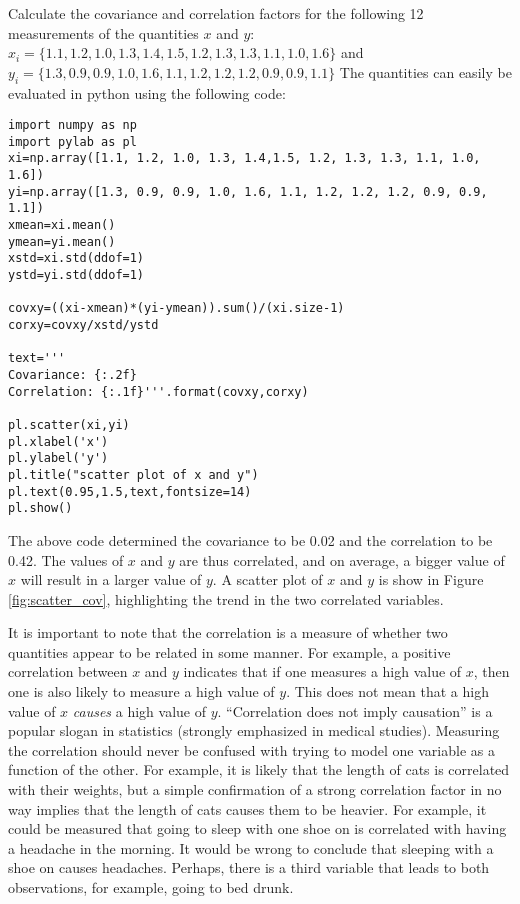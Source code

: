 \begin{example}{}{Calculate the covariance and correlation factors for the following 12 measurements of the quantities $x$ and $y$: $x_i=\{1.1, 1.2, 1.0, 1.3, 1.4,1.5, 1.2, 1.3, 1.3, 1.1, 1.0, 1.6\}$ and $y_i=\{1.3, 0.9, 0.9, 1.0, 1.6, 1.1, 1.2, 1.2, 1.2, 0.9, 0.9, 1.1\}$}{}
\label{ex:covariance}
The quantities can easily be evaluated in python using the following code:
\begin{lstlisting}[frame=single] 
import numpy as np
import pylab as pl
xi=np.array([1.1, 1.2, 1.0, 1.3, 1.4,1.5, 1.2, 1.3, 1.3, 1.1, 1.0, 1.6])
yi=np.array([1.3, 0.9, 0.9, 1.0, 1.6, 1.1, 1.2, 1.2, 1.2, 0.9, 0.9, 1.1])
xmean=xi.mean()
ymean=yi.mean()
xstd=xi.std(ddof=1)
ystd=yi.std(ddof=1)

covxy=((xi-xmean)*(yi-ymean)).sum()/(xi.size-1)
corxy=covxy/xstd/ystd

text='''
Covariance: {:.2f}
Correlation: {:.1f}'''.format(covxy,corxy)

pl.scatter(xi,yi)
pl.xlabel('x')
pl.ylabel('y')
pl.title("scatter plot of x and y")
pl.text(0.95,1.5,text,fontsize=14)
pl.show()
\end{lstlisting}
The above code determined the covariance to be 0.02 and the correlation to be 0.42. The values of $x$ and $y$ are thus correlated, and on average, a bigger value of $x$ will result in a larger value of $y$. A scatter plot of $x$ and $y$ is show in Figure \ref{fig:scatter_cov}, highlighting the trend in the two correlated variables.


\end{example}

It is important to note that the correlation is a measure of whether two quantities appear to be related in some manner. For example, a positive correlation between $x$ and $y$ indicates that if one measures a high value of $x$, then one is also likely to measure a high value of $y$. This does not mean that a high value of $x$ \textit{causes} a high value of $y$. ``Correlation does not imply causation'' is a popular slogan in statistics (strongly emphasized in medical studies). Measuring the correlation should never be confused with trying to model one variable as a function of the other. For example, it is likely that the length of cats is correlated with their weights, but a simple confirmation of a strong correlation factor in no way implies that the length of cats causes them to be heavier. For example, it could be measured that going to sleep with one shoe on is correlated with having a headache in the morning. It would be wrong to conclude that sleeping with a shoe on causes headaches. Perhaps, there is a third variable that leads to both observations, for example, going to bed drunk. 


